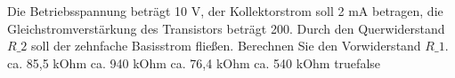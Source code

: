     {Die Betriebsspannung beträgt 10 V, der Kollektorstrom soll 2 mA betragen, die Gleichstromverstärkung des Transistors beträgt 200. Durch den Querwiderstand $R\_2$ soll der zehnfache Basisstrom fließen. Berechnen Sie den Vorwiderstand $R\_1$.}
    {ca. 85,5 kOhm}
    {ca. 940 kOhm}
    {ca. 76,4 kOhm}
    {ca. 540 kOhm}
    {true}{false}